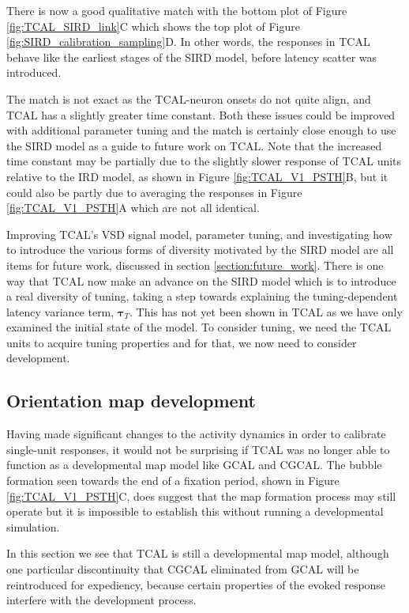 \documentclass[phd,ianc,twoside]{infthesis}
\begin{document}
There is now a good qualitative match with the bottom plot of Figure
\ref{fig:TCAL_SIRD_link}C which shows the top plot of Figure
\ref{fig:SIRD_calibration_sampling}D. In other words, the responses in
TCAL behave like the earliest stages of the SIRD model, before latency
scatter was introduced.

The match is not exact as the TCAL-neuron onsets do not quite align, and TCAL has a
slightly greater time constant. Both these issues could be improved with
additional parameter tuning and the match is certainly close enough to
use the SIRD model as a guide to future work on TCAL. Note that the
increased time constant may be partially due to the slightly slower
response of TCAL units relative to the IRD model, as shown in Figure
\ref{fig:TCAL_V1_PSTH}B, but it could also be partly due to averaging the
responses in Figure \ref{fig:TCAL_V1_PSTH}A which are not all identical.

Improving TCAL's VSD signal model, parameter tuning, and investigating
how to introduce the various forms of diversity motivated by the SIRD
model are all items for future work, discussed in section
\ref{section:future_work}. There is one way that TCAL now make an
advance on the SIRD model which is to introduce a real diversity of
tuning, taking a step towards explaining the tuning-dependent latency
variance term, $\pmb{\tau}_T$. This has not yet been shown in TCAL as we
have only examined the initial state of the model. To consider tuning,
we need the TCAL units to acquire tuning properties and for that, we now
need to consider development.

\subsection{Orientation map development}

Having made significant changes to the activity dynamics in order to
calibrate single-unit responses, it would not be surprising if TCAL was
no longer able to function as a developmental map model like GCAL and
CGCAL. The bubble formation seen towards the end of a fixation period,
shown in Figure \ref{fig:TCAL_V1_PSTH}C, does suggest that the map
formation process may still operate but it is impossible to establish
this without running a developmental simulation.

In this section we see that TCAL is still a developmental map model,
although one particular discontinuity that CGCAL eliminated from GCAL will
be reintroduced for expediency, because certain properties of the evoked
response interfere with the development process.
\end{document}
